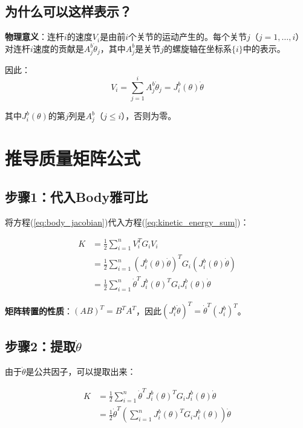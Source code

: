 \documentclass[12pt,a4paper]{article}
\begin{document}
\subsection{为什么可以这样表示？}

\textbf{物理意义}：连杆$i$的速度$V_i$是由前$i$个关节的运动产生的。每个关节$j$（$j = 1, \ldots, i$）对连杆$i$速度的贡献是$A_j^b \dot{\theta}_j$，其中$A_j^b$是关节$j$的螺旋轴在坐标系$\{i\}$中的表示。

因此：
\begin{equation}
V_i = \sum_{j=1}^{i} A_j^b \dot{\theta}_j = J_i^b(\theta) \dot{\theta}
\end{equation}

其中$J_i^b(\theta)$的第$j$列是$A_j^b$（$j \leq i$），否则为零。

\section{推导质量矩阵公式}

\subsection{步骤1：代入Body雅可比}

将方程(\ref{eq:body_jacobian})代入方程(\ref{eq:kinetic_energy_sum})：

\begin{align}
K &= \frac{1}{2}\sum_{i=1}^{n} V_i^T G_i V_i \\
&= \frac{1}{2}\sum_{i=1}^{n} (J_i^b(\theta) \dot{\theta})^T G_i (J_i^b(\theta) \dot{\theta}) \\
&= \frac{1}{2}\sum_{i=1}^{n} \dot{\theta}^T J_i^b(\theta)^T G_i J_i^b(\theta) \dot{\theta}
\label{eq:kinetic_energy_jacobian}
\end{align}

\textbf{矩阵转置的性质}：$(AB)^T = B^T A^T$，因此$(J_i^b \dot{\theta})^T = \dot{\theta}^T (J_i^b)^T$。

\subsection{步骤2：提取$\dot{\theta}$}

由于$\dot{\theta}$是公共因子，可以提取出来：

\begin{align}
K &= \frac{1}{2}\sum_{i=1}^{n} \dot{\theta}^T J_i^b(\theta)^T G_i J_i^b(\theta) \dot{\theta} \\
&= \frac{1}{2}\dot{\theta}^T \left(\sum_{i=1}^{n} J_i^b(\theta)^T G_i J_i^b(\theta)\right) \dot{\theta}
\label{eq:kinetic_energy_extracted}
\end{align}
\end{document}
